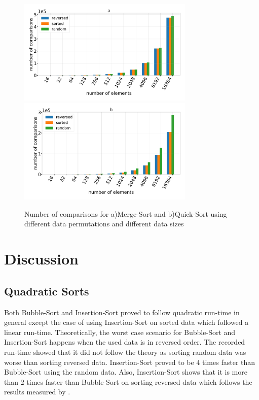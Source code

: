 \documentclass[sigconf, nonacm, natbib, screen, balance=False]{acmart}
\begin{document}
\begin{figure}
  \centering
  \includegraphics[width=84mm]{../figures/merge_number_comparisons.pdf}
  \includegraphics[width=84mm]{../figures/quick_number_comparisons.pdf}
  \caption{Number of comparisons for a)Merge-Sort and b)Quick-Sort using different data permutations and different data sizes}
  \label{fig:comparisons}
\end{figure}



\section{Discussion}\label{sec:discu}
\subsection{Quadratic Sorts}\label{sec:quad-disc}
Both Bubble-Sort and Insertion-Sort proved to follow quadratic run-time in general except the case of using Insertion-Sort on sorted data which followed a linear run-time. Theoretically, the worst case scenario for Bubble-Sort and Insertion-Sort happens when the used data is in reversed order. The recorded run-time showed that it did not follow the theory as sorting random data was worse than sorting reversed data. Insertion-Sort proved to be $4$ times faster than Bubble-Sort using the random data. Also, Insertion-Sort shows that it is more than $2$ times faster than Bubble-Sort on sorting reversed data which follows the results measured by \citet{astrachan}. 
\end{document}
